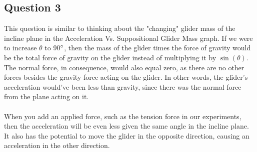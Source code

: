 \documentclass [12pt, letterpaper, twoside] {article}
\begin{document}
\subsection* {Question 3}
  This question is similar to thinking about the "changing" glider mass of the incline plane in the Acceleration Vs. Suppositional Glider Mass graph. If we were to increase \(\theta\) to 90\(\degree\), then the mass of the glider times the force of gravity would be the total force of gravity on the glider instead of multiplying it by \(\sin(\theta)\). The normal force, in consequence, would also equal zero, as there are no other forces besides the gravity force acting on the glider. In other words, the glider's acceleration would've been less than gravity, since there was the normal force from the plane acting on it. \\\\
When you add an applied force, such as the tension force in our experiments, then the acceleration will be even less given the same angle in the incline plane. It also has the potential to move the glider in the opposite direction, causing an acceleration in the other direction.
\end{document}
